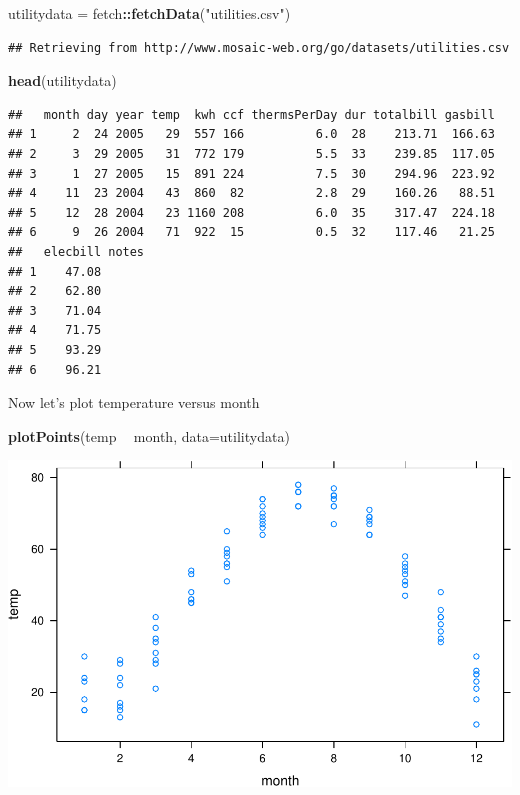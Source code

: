 \documentclass[
]{book}
\newenvironment{Shaded}{\begin{snugshade}}{\end{snugshade}}
\newcommand{\DataTypeTok}[1]{\textcolor[rgb]{0.13,0.29,0.53}{#1}}
\newcommand{\KeywordTok}[1]{\textcolor[rgb]{0.13,0.29,0.53}{\textbf{#1}}}
\newcommand{\NormalTok}[1]{#1}
\newcommand{\OperatorTok}[1]{\textcolor[rgb]{0.81,0.36,0.00}{\textbf{#1}}}
\newcommand{\StringTok}[1]{\textcolor[rgb]{0.31,0.60,0.02}{#1}}
\begin{document}
\begin{Shaded}
\begin{Highlighting}[]
\NormalTok{utilitydata =}\StringTok{ }\NormalTok{fetch}\OperatorTok{::}\KeywordTok{fetchData}\NormalTok{(}\StringTok{"utilities.csv"}\NormalTok{)}
\end{Highlighting}
\end{Shaded}

\begin{verbatim}
## Retrieving from http://www.mosaic-web.org/go/datasets/utilities.csv
\end{verbatim}

\begin{Shaded}
\begin{Highlighting}[]
\KeywordTok{head}\NormalTok{(utilitydata)}
\end{Highlighting}
\end{Shaded}

\begin{verbatim}
##   month day year temp  kwh ccf thermsPerDay dur totalbill gasbill
## 1     2  24 2005   29  557 166          6.0  28    213.71  166.63
## 2     3  29 2005   31  772 179          5.5  33    239.85  117.05
## 3     1  27 2005   15  891 224          7.5  30    294.96  223.92
## 4    11  23 2004   43  860  82          2.8  29    160.26   88.51
## 5    12  28 2004   23 1160 208          6.0  35    317.47  224.18
## 6     9  26 2004   71  922  15          0.5  32    117.46   21.25
##   elecbill notes
## 1    47.08      
## 2    62.80      
## 3    71.04      
## 4    71.75      
## 5    93.29      
## 6    96.21
\end{verbatim}

Now let's plot temperature versus month

\begin{Shaded}
\begin{Highlighting}[]
\KeywordTok{plotPoints}\NormalTok{(temp }\OperatorTok{~}\StringTok{ }\NormalTok{month, }\DataTypeTok{data=}\NormalTok{utilitydata)}
\end{Highlighting}
\end{Shaded}

\includegraphics{_bookdown_files/math135_handbook_files/figure-latex/unnamed-chunk-40-1.pdf}
\end{document}
